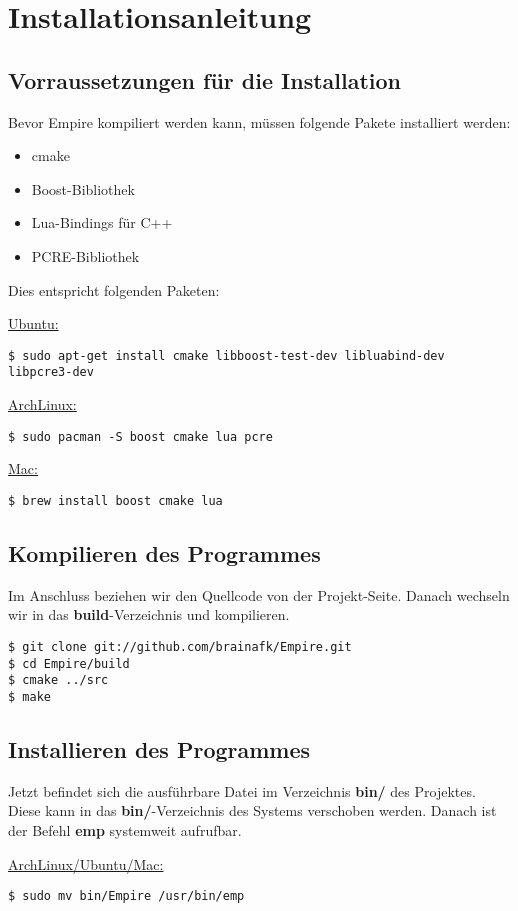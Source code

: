 
\section{Installationsanleitung}

\subsection{Vorraussetzungen für die Installation}
Bevor Empire kompiliert werden kann, müssen folgende Pakete installiert werden:

\begin{itemize}
	\item cmake
	\item Boost-Bibliothek
	\item Lua-Bindings für C++
	\item PCRE-Bibliothek
\end{itemize}

Dies entspricht folgenden Paketen:

\underline{Ubuntu:}
\begin{lstlisting}[style=Bash]
$ sudo apt-get install cmake libboost-test-dev libluabind-dev libpcre3-dev
\end{lstlisting}

\underline{ArchLinux:}
\begin{lstlisting}[style=Bash]
$ sudo pacman -S boost cmake lua pcre
\end{lstlisting}

\underline{Mac:}
\begin{lstlisting}[style=Bash]
$ brew install boost cmake lua
\end{lstlisting}

\subsection{Kompilieren des Programmes}

Im Anschluss beziehen wir den Quellcode von der Projekt-Seite. Danach wechseln wir in das \textbf{build}-Verzeichnis und kompilieren.

\begin{lstlisting}[style=Bash]
$ git clone git://github.com/brainafk/Empire.git
$ cd Empire/build
$ cmake ../src
$ make
\end{lstlisting}

\subsection{Installieren des Programmes}

Jetzt befindet sich die ausführbare Datei im Verzeichnis \textbf{bin/} des Projektes. Diese kann in das \textbf{bin/}-Verzeichnis des Systems verschoben werden. Danach ist der Befehl \textbf{emp} systemweit aufrufbar.

\underline{ArchLinux/Ubuntu/Mac:}
\begin{lstlisting}[style=Bash]
$ sudo mv bin/Empire /usr/bin/emp
\end{lstlisting}
